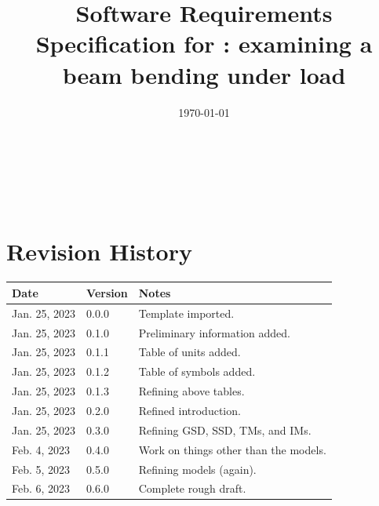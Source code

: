\documentclass[12pt]{article}
\begin{document}
\ifcomments
    \todototoc
    \listoftodos
    \newpage
\fi


\title{Software Requirements Specification for \progname{}: examining a beam
    bending under load}
\author{\authname}
\date{\today}

\maketitle

~\newpage


\tableofcontents

~\newpage


\section*{Revision History}

\begin{tabularx}{\textwidth}{p{3cm}p{2cm}X}
    \toprule {\bf Date} & {\bf Version} & {\bf Notes}                           \\
    \midrule
    Jan. 25, 2023       & 0.0.0         & Template imported.                    \\
    Jan. 25, 2023       & 0.1.0         & Preliminary information added.        \\
    Jan. 25, 2023       & 0.1.1         & Table of units added.                 \\
    Jan. 25, 2023       & 0.1.2         & Table of symbols added.               \\
    Jan. 25, 2023       & 0.1.3         & Refining above tables.                \\
    Jan. 25, 2023       & 0.2.0         & Refined introduction.                 \\
    Jan. 25, 2023       & 0.3.0         & Refining GSD, SSD, TMs, and IMs.      \\
    Feb. 4, 2023        & 0.4.0         & Work on things other than the models. \\
    Feb. 5, 2023        & 0.5.0         & Refining models (again).              \\
    Feb. 6, 2023        & 0.6.0         & Complete rough draft.                 \\
    \bottomrule
\end{tabularx}
\end{document}
